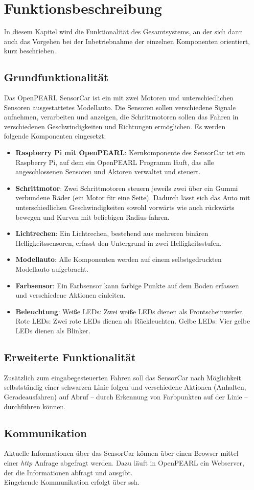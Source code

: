 \chapter{Funktionsbeschreibung}
\label{funktionsbeschreibung}

In diesem Kapitel wird die Funktionalität des Gesamtsystems, an der sich dann auch das Vorgehen bei der Inbetriebnahme der einzelnen Komponenten orientiert, kurz beschrieben.

\section{Grundfunktionalität}
Das OpenPEARL SensorCar ist ein mit zwei Motoren und unterschiedlichen Sensoren ausgestattetes Modellauto. Die Sensoren sollen verschiedene Signale aufnehmen, verarbeiten und anzeigen, die Schrittmotoren sollen das Fahren in verschiedenen Geschwindigkeiten und Richtungen ermöglichen.
Es werden folgende Komponenten eingesetzt:\\

\begin{itemize}
	\item \textbf{Raspberry Pi mit OpenPEARL}: Kernkomponente des SensorCar ist ein Raspberry Pi, auf dem ein OpenPEARL Programm läuft, das alle angeschlossenen Sensoren und Aktoren verwaltet und steuert.
	\item \textbf{Schrittmotor}: Zwei Schrittmotoren steuern jeweils zwei über ein Gummi verbundene Räder (ein Motor für eine Seite). Dadurch lässt sich das Auto mit unterschiedlichen Geschwindigkeiten sowohl vorwärts wie auch rückwärts bewegen und Kurven mit beliebigen Radius fahren.
	\item \textbf{Lichtrechen}: Ein Lichtrechen, bestehend aus mehreren binären Helligkeitssensoren, erfasst den Untergrund in zwei Helligkeitsstufen. 
	\item \textbf{Modellauto}: Alle Komponenten werden auf einem selbstgedruckten Modellauto aufgebracht.
	\item \textbf{Farbsensor}: Ein Farbsensor kann farbige Punkte auf dem Boden erfassen und verschiedene Aktionen einleiten.
	\item \textbf{Beleuchtung}:
		\subitem Weiße LEDs: Zwei weiße LEDs dienen als Frontscheinwerfer.
		\subitem Rote LEDs: Zwei rote LEDs dienen als Rückleuchten.
		\subitem Gelbe LEDs: Vier gelbe LEDs dienen als Blinker.
\end{itemize}

\section{Erweiterte Funktionalität}
Zusätzlich zum eingabegesteuerten Fahren soll das SensorCar nach Möglichkeit selbstständig einer schwarzen Linie folgen und verschiedene Aktionen (Anhalten, Geradeausfahren) auf Abruf -- durch Erkennung von Farbpunkten auf der Linie -- durchführen können.

\section{Kommunikation}
Aktuelle Informationen über das SensorCar können über einen Browser mittel einer \emph{http} Anfrage abgefragt werden. Dazu läuft in OpenPEARL ein Webserver, der die Informationen abfragt und ausgibt.\\
Eingehende Kommunikation erfolgt über ssh.




